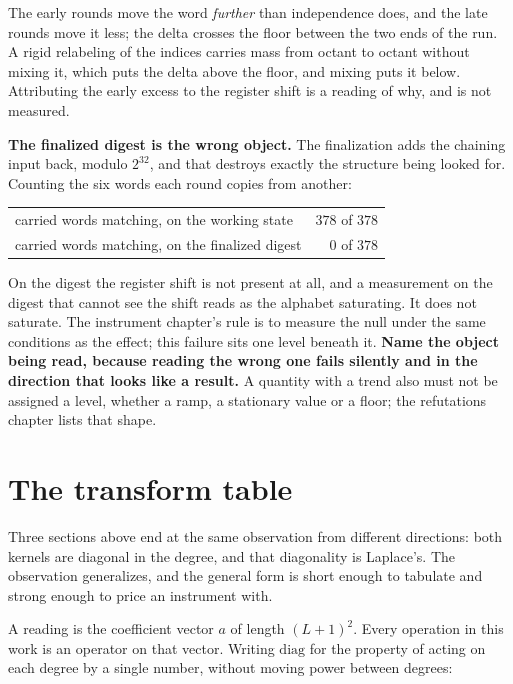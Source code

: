 The early rounds move the word \emph{further} than independence does, and the late rounds move it less; the delta crosses the floor between the two ends of the run. A rigid relabeling of the indices carries mass from octant to octant without mixing it, which puts the delta above the floor, and mixing puts it below. Attributing the early excess to the register shift is a reading of why, and is not measured.

\textbf{The finalized digest is the wrong object.} The finalization adds the chaining input back, modulo \(2^{32}\), and that destroys exactly the structure being looked for. Counting the six words each round copies from another:

\begin{center}
\begin{tabular}{lr}
\toprule
carried words matching, on the working state & \(378\) of \(378\) \\
carried words matching, on the finalized digest & \(0\) of \(378\) \\
\bottomrule
\end{tabular}
\end{center}

On the digest the register shift is not present at all, and a measurement on the digest that cannot see the shift reads as the alphabet saturating. It does not saturate. The instrument chapter's rule is to measure the null under the same conditions as the effect; this failure sits one level beneath it. \textbf{Name the object being read, because reading the wrong one fails silently and in the direction that looks like a result.} A quantity with a trend also must not be assigned a level, whether a ramp, a stationary value or a floor; the refutations chapter lists that shape.

\section{The transform table}
\label{sec:transforms}

Three sections above end at the same observation from different directions: both kernels are diagonal in the degree, and that diagonality is Laplace's. The observation generalizes, and the general form is short enough to tabulate and strong enough to price an instrument with.

A reading is the coefficient vector \(a\) of length \((L+1)^2\). Every operation in this work is an operator on that vector. Writing \(\mathrm{diag}\) for the property of acting on each degree by a single number, without moving power between degrees:

